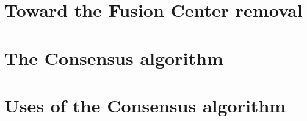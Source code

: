 \section{Toward the Fusion Center removal}

\section{The Consensus algorithm}

\section{Uses of the Consensus algorithm}
